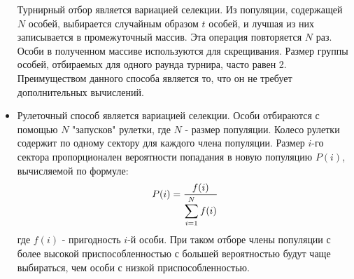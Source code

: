 \begin{itemize}[label=$\ast$]
Турнирный отбор является вариацией селекции. Из популяции, содержащей $N$ особей, выбирается случайным образом $t$ особей, и лучшая из них записывается в промежуточный массив. Эта операция повторяется $N$ раз. Особи в полученном массиве используются для скрещивания. 
Размер группы особей, отбираемых для одного раунда турнира, часто равен 2. 
Преимуществом данного способа является то, что он не требует дополнительных вычислений.
	\item {}

Рулеточный способ является вариацией селекции. Особи отбираются с помощью $N$ "запусков" рулетки, где $N$ - размер популяции. Колесо рулетки содержит по одному сектору для каждого члена популяции. Размер $i$-го сектора пропорционален вероятности попадания в новую популяцию $P(i)$, вычисляемой по формуле:
\begin{eqnarray*}
	P(i) = \frac{f(i)}{\displaystyle \sum\displaylimits_{i=1}^{N} f(i)}
\end{eqnarray*}
где $f(i)$ - пригодность $i$-й особи.
При таком отборе члены популяции с более высокой приспособленностью с большей вероятностью будут чаще выбираться, чем особи с низкой приспособленностью.
\end{itemize}


